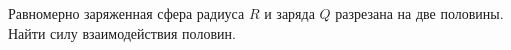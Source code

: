 \begin{tproblem}
  Равномерно заряженная сфера радиуса $R$ и заряда $Q$ разрезана на
  две половины. Найти силу взаимодействия половин.
\end{tproblem}
